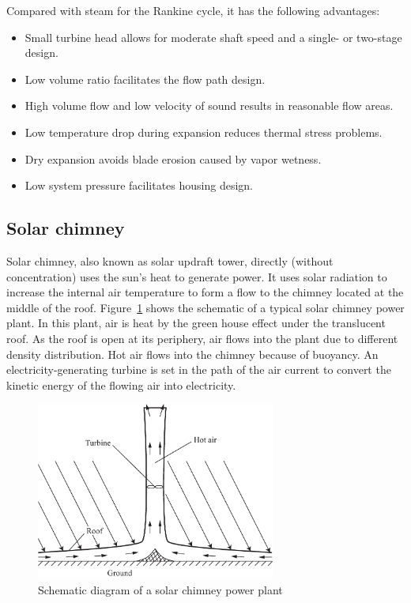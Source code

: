 
Compared with steam for the Rankine cycle, it has the following advantages:
\begin{itemize}
  \item  Small turbine head allows for moderate shaft speed and a single- or two-stage design.
    \item Low volume ratio facilitates the flow path design.
    \item High volume flow and low velocity of sound results in reasonable flow areas.
    \item Low temperature drop during expansion reduces thermal stress problems.
    \item Dry expansion avoids blade erosion caused by vapor wetness.
    \item Low system pressure facilitates housing design.
  \end{itemize}

\subsection{Solar chimney}
\label{sec:sc}
Solar chimney, also known as solar updraft tower, directly (without concentration) uses the sun's heat to generate power. It uses solar radiation to increase the internal air temperature to form a flow to the chimney located at the middle of the roof. Figure~\ref{fig:SolarChimney} shows the schematic of a typical solar chimney power plant. In this plant, air is heat by the green house effect under the translucent roof. As the roof is open at its periphery, air flows into the plant due to different density distribution. Hot air flows into the chimney because of buoyancy. An electricity-generating turbine is set in the path of the air current to convert the kinetic energy of the flowing air into electricity.

\begin{figure}[!ht]
\centering 
\includegraphics[width=0.7\textwidth]{fig/SolarChimney}
\caption{Schematic diagram of a solar chimney power plant}\label{fig:SolarChimney}
\end{figure}

